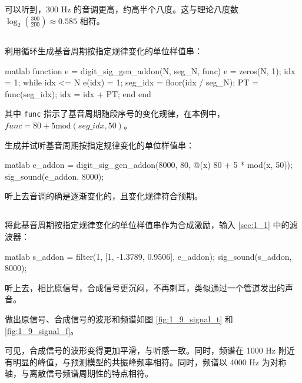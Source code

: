 \documentclass[a4paper]{article}  %
\begin{document}
可以听到，300 Hz 的音调更高，约高半个八度。这与理论八度数 $\log_2(\frac{300}{200}) \approx 0.585$ 相符。

\subsection{}

利用循环生成基音周期按指定规律变化的单位样值串：
\begin{codeblock}{matlab}
function e = digit_sig_gen_addon(N, seg_N, func)
    e = zeros(N, 1);
    idx = 1;
    while idx <= N
        e(idx) = 1;
        seg_idx = floor(idx / seg_N);
        PT = func(seg_idx);
        idx = idx + PT;
    end 
end
\end{codeblock}

其中 \texttt{func} 指示了基音周期随段序号的变化规律，在本例中，$func = 80 + 5\text{mod}(seg\_idx, 50)$。

生成并试听基音周期按指定规律变化的单位样值串：
\begin{codeblock}{matlab}
e_addon = digit_sig_gen_addon(8000, 80, @(x) 80 + 5 * mod(x, 50));
sig_sound(e_addon, 8000);
\end{codeblock}

听上去音调的确是逐渐变化的，且变化规律符合预期。

\subsection{}

将此基音周期按指定规律变化的单位样值串作为合成激励，输入 \ref{sec:1_1} 中的滤波器：
\begin{codeblock}{matlab}
s_addon = filter(1, [1, -1.3789, 0.9506], e_addon);
sig_sound(s_addon, 8000);
\end{codeblock}

听上去，相比原信号，合成信号更沉闷，不再刺耳，类似通过一个管道发出的声音。

做出原信号、合成信号的波形和频谱如图 \ref{fig:1_9_signal_t} 和 \ref{fig:1_9_signal_f}。

可见，合成信号的波形变得更加平滑，与听感一致。同时，频谱在 1000 Hz 附近有明显的峰值，与预测模型的共振峰频率相符。同时，频谱以 4000 Hz 为对称轴，与离散信号频谱周期性的特点相符。
\end{document}
